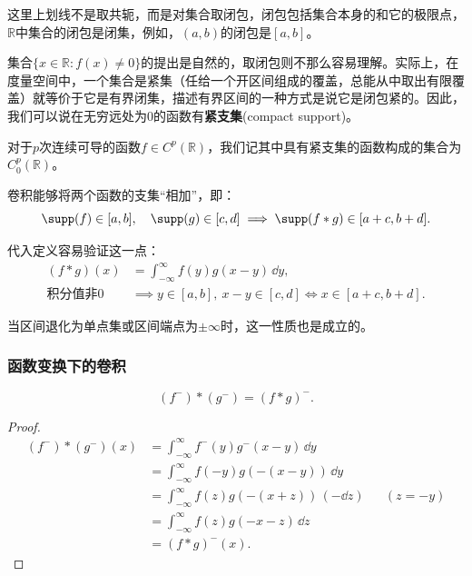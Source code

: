 这里上划线不是取共轭，而是对集合取闭包，闭包包括集合本身的和它的极限点，$\mathbb{R}$中集合的闭包是闭集，例如，$(a,b)$的闭包是$[a,b]$。

集合$\{x\in\mathbb{R}:f(x)\neq 0\}$的提出是自然的，取闭包则不那么容易理解。实际上，在度量空间中，一个集合是紧集（任给一个开区间组成的覆盖，总能从中取出有限覆盖）就等价于它是有界闭集，描述有界区间的一种方式是说它是闭包紧的。因此，我们可以说在无穷远处为0的函数有\textbf{紧支集}(compact support)。
\begin{definition}[紧支函数空间]
    对于$p$次连续可导的函数$f\in C^p(\mathbb{R})$，我们记其中具有紧支集的函数构成的集合为$C_0^p(\mathbb{R})$。
\end{definition}

\begin{proposition}
    \label{prop:conv_supp}
    卷积能够将两个函数的支集“相加”，即：
    \begin{equation}
        \supp(f)\in [a,b],\quad \supp(g)\in [c,d]\implies \supp(f*g)\in [a+c,b+d].
    \end{equation}
\end{proposition}

代入定义容易验证这一点：
\begin{align}
     (f*g)(x) &=\int_{-\infty}^{\infty}f(y)g(x-y)\,\dd y,\\
     \text{积分值非0}&\implies y\in [a,b],\ x-y\in [c,d]\iff x\in [a+c,b+d].
\end{align}

当区间退化为单点集或区间端点为$\pm\infty$时，这一性质也是成立的。

\subsubsection{函数变换下的卷积}
\begin{proposition}[函数反转下的卷积]
    \begin{equation}
        (f^-)*(g^-)=(f*g)^-.
    \end{equation}
\end{proposition}
\begin{proof}
    \begin{align}
        (f^-)*(g^-)(x) & =\int_{-\infty}^{\infty}f^-(y)g^-(x-y)\,\dd y\nonumber          \\
                       & =\int_{-\infty}^{\infty}f(-y)g(-(x-y))\,\dd y\nonumber          \\
                       & =\int_{-\infty}^{\infty}f(z)g(-(x+z))\,(-\dd z) && (z=-y)\nonumber \\
                       & =\int_{-\infty}^{\infty}f(z)g(-x-z)\,\dd z\nonumber             \\
                       & =(f*g)^-(x).
    \end{align}
\end{proof}

